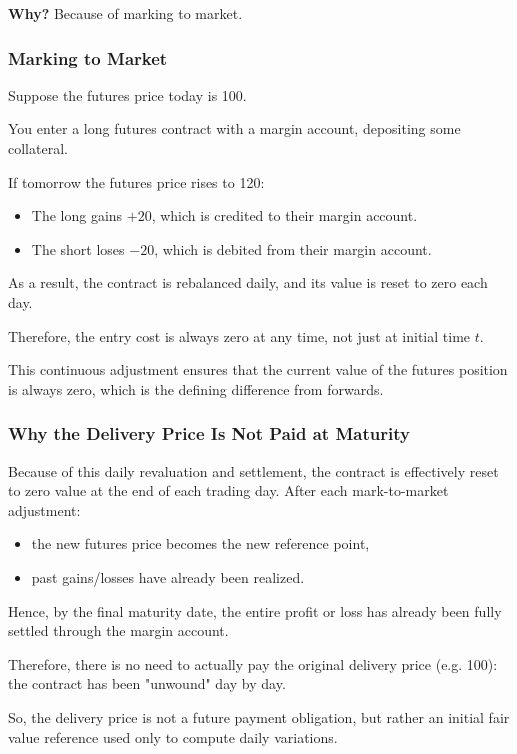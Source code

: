 \documentclass[12pt,a4paper]{article}
\theoremstyle{definition}
\begin{document}
\textbf{Why?} Because of marking to market.

\subsubsection{Marking to Market}

Suppose the futures price today is 100.

You enter a long futures contract with a margin account, depositing some collateral.

If tomorrow the futures price rises to 120:
\begin{itemize}
\item The long gains $+20$, which is credited to their margin account.
\item The short loses $-20$, which is debited from their margin account.
\end{itemize}

As a result, the contract is rebalanced daily, and its value is reset to zero each day.

Therefore, the entry cost is always zero at any time, not just at initial time $t$.

This continuous adjustment ensures that the current value of the futures position is always zero, which is the defining difference from forwards.

\subsubsection{Why the Delivery Price Is Not Paid at Maturity}

Because of this daily revaluation and settlement, the contract is effectively reset to zero value at the end of each trading day. After each mark-to-market adjustment:
\begin{itemize}
\item the new futures price becomes the new reference point,
\item past gains/losses have already been realized.
\end{itemize}

Hence, by the final maturity date, the entire profit or loss has already been fully settled through the margin account.

Therefore, there is no need to actually pay the original delivery price (e.g. 100): the contract has been "unwound" day by day.

So, the delivery price is not a future payment obligation, but rather an initial fair value reference used only to compute daily variations.
\end{document}
